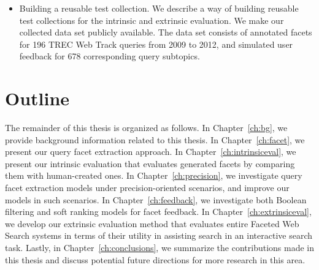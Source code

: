 \begin{itemize}
\item Building a reusable test collection. We describe a way of building reusable test collections for the intrinsic and extrinsic evaluation. We make our collected data set publicly available. The data set consists of annotated facets for 196 TREC Web Track queries from 2009 to 2012, and simulated user feedback for 678 corresponding query subtopics.

\end{itemize}

\section{Outline}
The remainder of this thesis is organized as follows. 
In Chapter~\ref{ch:bg}, we provide background information related to this thesis. In Chapter~\ref{ch:facet}, we present our query facet extraction approach. 
In Chapter~\ref{ch:intrinsiceval}, we present our intrinsic evaluation that evaluates generated facets by comparing them with human-created ones.
In Chapter~\ref{ch:precision}, we investigate query facet extraction models under precision-oriented scenarios, and improve our models in such scenarios.
In Chapter~\ref{ch:feedback}, we investigate both Boolean filtering and soft ranking models for facet feedback.
In Chapter~\ref{ch:extrinsiceval}, we develop our extrinsic evaluation method that evaluates entire Faceted Web Search systems in terms of their utility in assisting search in an interactive search task.
Lastly, in Chapter~\ref{ch:conclusions}, we summarize the contributions made in this thesis and discuss potential future directions for more research in this area.




